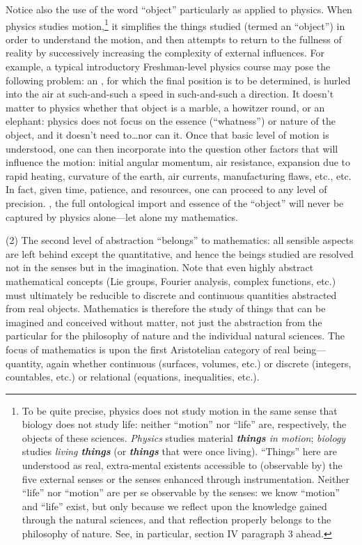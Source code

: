 Notice also the use of the word ``object'' particularly as applied to physics. When physics studies motion,\footnote{To be quite precise, physics does not study motion in the same sense that biology does not study life: neither “motion” nor “life” are, respectively, the objects of these sciences. \textit{Physics} studies material \textit{\textbf{things} in motion}; \textit{biology} studies \textit{living \textbf{things}} (or \textit{\textbf{things}} that were once living). “Things” here are understood as real, extra-mental existents accessible to (observable by) the five external senses or the senses enhanced through instrumentation. Neither “life” nor “motion” are per se observable by the senses: we know “motion” and “life” exist, but only because we reflect upon the knowledge gained through the natural sciences, and that reflection properly belongs to the philosophy of nature. See, in particular, section IV paragraph 3 ahead.} it simplifies the things studied (termed an ``object'') in order to understand the motion, and then attempts to return to the fullness of reality by successively increasing the complexity of external influences. For example, a typical introductory Freshman-level physics course may pose the following problem: an , for which the final position is to be determined, is hurled into the air at such-and-such a speed in such-and-such a direction. It doesn't matter to physics whether that object is a marble, a howitzer round, or an elephant: physics does not focus on the essence (``whatness'') or nature of the object, and it doesn't need to\ldots nor can it. Once that basic level of motion is understood, one can then incorporate into the question other factors that will influence the motion: initial angular momentum, air resistance, expansion due to rapid heating, curvature of the earth, air currents, manufacturing flaws, etc., etc. In fact, given time, patience, and resources, one can proceed to any level of precision. , the full ontological import and essence of the ``object'' will never be captured by physics alone---let alone my mathematics.

(2) The second level of abstraction ``belongs'' to mathematics: all sensible aspects are left behind except the quantitative, and hence the beings studied are resolved not in the senses but in the imagination. Note that even highly abstract mathematical concepts (Lie groups, Fourier analysis, complex functions, etc.) must ultimately be reducible to discrete and continuous quantities abstracted from real objects. Mathematics is therefore the study of things that can be imagined and conceived without matter, not just the abstraction from the particular for the philosophy of nature and the individual natural sciences. The focus of mathematics is upon the first Aristotelian category of real being---quantity, again whether continuous (surfaces, volumes, etc.) or discrete (integers, countables, etc.) or relational (equations, inequalities, etc.).

